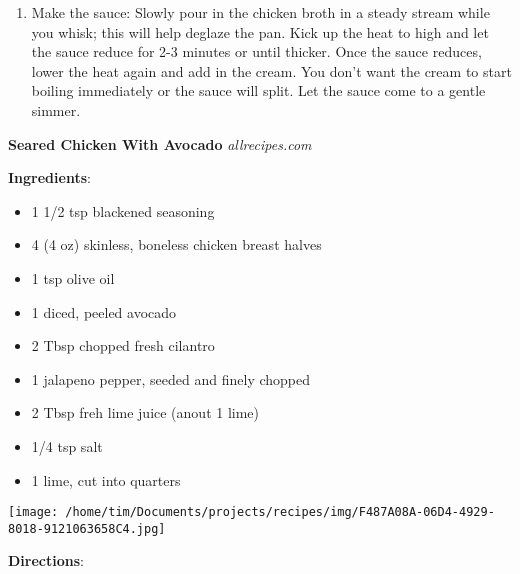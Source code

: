 \documentclass[11pt, twoside, openany]{book}
\begin{document}
\begin{minipage}[t]{\linewidth}
\begin{enumerate}
\item Make the sauce: Slowly pour in the chicken broth in a steady stream while you whisk; this will help deglaze the pan. Kick up the heat to high and let the sauce reduce for 2-3 minutes or until thicker. Once the sauce reduces, lower the heat again and add in the cream. You don't want the cream to start boiling immediately or the sauce will split. Let the sauce come to a gentle simmer.
\end{enumerate}
\end{minipage}\vspace{8mm}
\noindent\begin{minipage}[t]{\linewidth}%
{\Large\textbf{Seared Chicken With Avocado}} \label{seared-chicken-with-avocado}\hfill\textit{allrecipes.com}\\
\noindent\begin{minipage}[t]{0.78\linewidth}%
\textbf{Ingredients}:\vspace{-3mm}
\begin{multicols}{2}
\begin{itemize}\setlength\itemsep{-1mm}
\item 1 1/2 tsp blackened seasoning
\item 4 (4 oz) skinless, boneless chicken breast halves
\item 1 tsp olive oil
\item 1 diced, peeled avocado
\item 2 Tbsp chopped fresh cilantro
\item 1 jalapeno pepper, seeded and finely chopped
\item 2 Tbsp freh lime juice (anout 1 lime)
\item 1/4 tsp salt
\item 1 lime, cut into quarters
\end{itemize}
\end{multicols}
\end{minipage}
\noindent\begin{minipage}[t]{0.18\linewidth}
\centering \strut\vspace*{-\baselineskip}\newline
\texttt{[image: /home/tim/Documents/projects/recipes/img/F487A08A-06D4-4929-8018-9121063658C4.jpg]}\\
\end{minipage}\vspace{3mm}
\textbf{Directions}:
\vspace{-3mm}\begin{enumerate}\setlength\itemsep{-1mm}

\end{enumerate}
\end{minipage}
\end{document}

